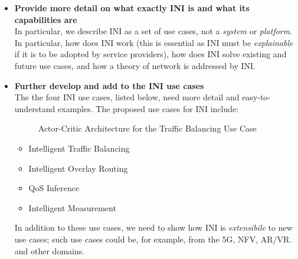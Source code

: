 \documentclass[11pt, oneside]{article}   	%
\begin{document}
\begin{itemize}
\item \textbf{Provide more detail on what exactly INI is and what its capabilities are} \\
In particular,  we describe INI as a set of use cases, not a \emph{system} or \emph{platform}.  In particular,  how does INI work (this is essential as INI must be \emph{explainable} 
if it is to be adopted by service providers), how does INI solve existing and future use cases,
and how a theory of network is addressed by INI.

\item \textbf{Further develop and add to the INI use cases} \\
The the four INI use cases, listed below, need more detail and easy-to-understand examples. The proposed use cases for INI include:

\begin{figure}
\caption{Actor-Critic Architecture for the Traffic Balancing Use Case}
\label{fig:ac}
\end{figure}

\begin{itemize}
\item Intelligent Traffic Balancing
\item Intelligent Overlay Routing
\item QoS Inference
\item Intelligent Measurement
\end{itemize}

\bigskip
\noindent
In addition to these use cases, we need to show how INI is \emph{extensibile} to new use cases; such use cases could be, for example, from the 5G, NFV, AR/VR. and 
other domains.


\end{itemize}
\end{document}
